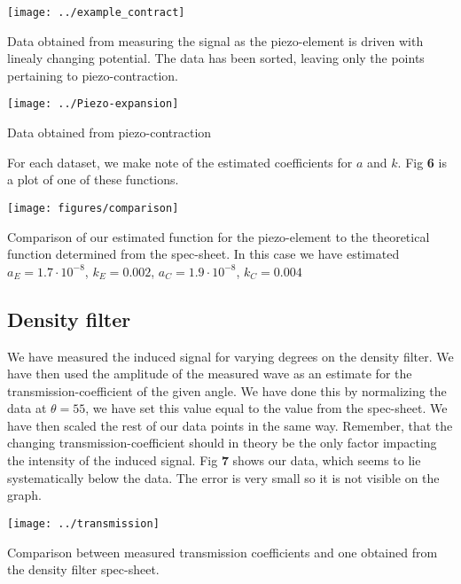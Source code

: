 \documentclass[working, oneside]{inputs/tuftebook}
\begin{document}
\begin{marginfigure}[-450pt]
	\texttt{[image: ../example\_contract]}
	\caption{Data obtained from measuring the signal as the piezo-element is driven with linealy changing potential. The data has been sorted, leaving only the points pertaining to piezo-contraction.}
\end{marginfigure}
\begin{marginfigure}[-250pt]
	\texttt{[image: ../Piezo-expansion]}
	\caption{Data obtained from piezo-contraction}
\end{marginfigure}
For each dataset, we make note of the estimated coefficients for $a$ and $k$. Fig  \textbf{6} is a plot of one of these functions. 
\begin{marginfigure}[-100pt]
	\texttt{[image: figures/comparison]}
	\caption{Comparison of our estimated function for the piezo-element to the theoretical function determined from the spec-sheet. In this case we have estimated $a_E = 1.7 \cdot 10^{-8}$, $k_E = 0.002$,  $a_C = 1.9 \cdot 10^{-8}$, $k_C = 0.004$}
\end{marginfigure}
\subsection*{Density filter}
We have measured the induced signal for varying degrees on the density filter. We have then used the amplitude of the measured wave as an estimate for the transmission-coefficient of the given angle. We have done this by normalizing the data at $\theta = 55$, we have set this value equal to the value from the spec-sheet. We have then scaled the rest of our data points in the same way. Remember, that the changing transmission-coefficient should in theory be the only factor impacting the intensity of the induced signal. Fig \textbf{7} shows our data, which seems to lie systematically below the data. The error is very small so it is not visible on the graph.
\begin{marginfigure}[-10pt]
	\texttt{[image: ../transmission]}
	\caption{Comparison between measured transmission coefficients and one obtained from the density filter spec-sheet.}
\end{marginfigure}
\end{document}
